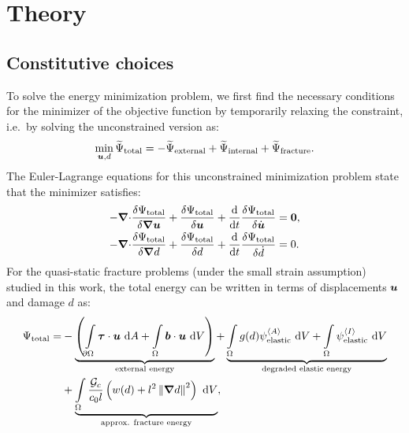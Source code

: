 \section{Theory}
\label{section: cohesive/theory}

\subsection{Constitutive choices}

To solve the energy minimization problem, we first find the necessary conditions for the minimizer of the objective function by temporarily relaxing the constraint, i.e.\ by solving the unconstrained version as:
\begin{align}
  \min_{\boldsymbol{u},d} \widetilde{\Psi}_{\text{total}} = -\widetilde{\Psi}_{\text{external}} + \widetilde{\Psi}_{\text{internal}} + \widetilde{\Psi}_{\text{fracture}} .
\end{align}
The Euler-Lagrange equations for this unconstrained minimization problem state that the minimizer satisfies:
\begin{subequations}
  \begin{align}
    - {\boldsymbol{\nabla} \cdot} \dfrac{\delta \Psi_{\text{total}}}{\delta \boldsymbol{\nabla}\boldsymbol{u}} + \dfrac{\delta \Psi_{\text{total}}}{\delta \boldsymbol{u}} + \dfrac{\text{d}}{\text{d}t}\dfrac{\delta \Psi_{\text{total}}}{\delta \Dot{\boldsymbol{u}}} & = \boldsymbol{0} , \\
    - {\boldsymbol{\nabla} \cdot} \dfrac{\delta \Psi_{\text{total}}}{\delta \boldsymbol{\nabla} d} + \dfrac{\delta \Psi_{\text{total}}}{\delta d} + \dfrac{\text{d}}{\text{d}t}\dfrac{\delta \Psi_{\text{total}}}{\delta \Dot{d}}               & = 0 .
  \end{align}
\end{subequations}
For the quasi-static fracture problems (under the small strain assumption) studied in this work, the total energy can be written in terms of displacements $\boldsymbol{u}$ and damage $d$ as:
\begin{equation}
  \begin{split}
    \Psi_{\text{total}} = & -\underbrace{\left( \int\limits_{\partial \Omega} \boldsymbol{\tau} \cdot \boldsymbol{u} \text{ d}A + \int\limits_\Omega \boldsymbol{b} \cdot \boldsymbol{u} \text{ d}V \right)}_{\text{external energy}} + \underbrace{\int\limits_\Omega g(d)\psi_{\text{elastic}}^{\left< A \right>} \text{ d}V + \int\limits_\Omega \psi_{\text{elastic}}^{\left< I \right>} \text{ d}V}_{\text{degraded elastic energy}} \\ & + \underbrace{\int\limits_\Omega \dfrac{{\mathcal{G}_c}}{c_0l} \left( w(d) + l^2 \left\lVert\boldsymbol{\nabla} d\right\rVert^2 \right) \text{ d}V}_{\text{approx. fracture energy}},
  \end{split}
\end{equation}
